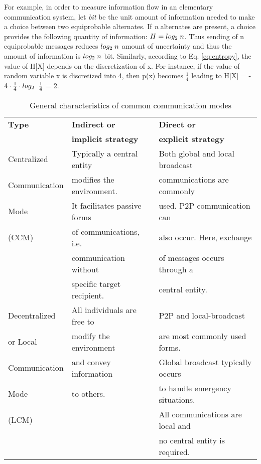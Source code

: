 For example, in order to measure information flow in an elementary communication system, let {\em bit} be the unit amount of information needed to make a choice between two equiprobable alternates. If {\em n} alternates are present, a choice provides the following quantity of information: $H = log_{2} \hspace{1mm} n $. Thus sending of n equiprobable messages reduces $log_{2} \hspace{1mm} n $ amount of uncertainty and thus the amount of information is  $log_{2} \hspace{1mm} n $ bit.  Similarly, according to Eq. \ref{eq:entropy}, the value of H[X] depends on the discretization of x. For instance, if the value of random variable x is discretized into 4, then p(x) becomes $\frac{1}{4}$  leading to H[X] = - $ 4 \cdot \frac{1}{4} \cdot log_{2} \hspace{2mm} \frac{1}{4}$  = 2.\\
\begin{table}
\caption{General characteristics of common communication modes}
\label{table:comm-classify}
\begin{center}
\begin{tabular}{|l||l|l|}
\hline \textbf{Type} & \textbf{Indirect or} & \textbf{Direct or }\\
& \textbf{implicit strategy} & \textbf{explicit strategy}\\
\hline Centralized & Typically a central entity   & Both global and local broadcast  \\
Communication & modifies the environment. & communications are commonly\\
Mode & It facilitates passive forms  &  used. P2P  communication can \\
(CCM)  &  of communications, i.e.     & also occur. Here, exchange\\
&  communication without   &    of messages  occurs through a\\
& specific target recipient. &  central entity.\\
\hline Decentralized & All individuals are free to & P2P and local-broadcast \\
or Local & modify the environment &  are  most commonly used forms. \\
Communication & and convey information &  Global broadcast typically  occurs \\
Mode & to others. & to handle emergency situations. \\
(LCM) & & All communications are local and\\
& & no central entity is required.\\
\hline
\end{tabular}
\end{center}
\end{table}
